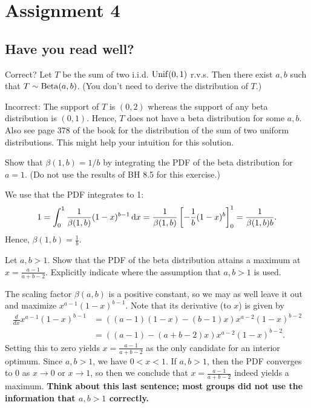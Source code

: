\documentclass[assignments]{subfiles}
\begin{document}
\setcounter{section}{3}
\section{Assignment 4}


\subsection{Have you read well?}


\begin{exercise}
Correct? Let $T$ be the sum of two i.i.d. $\mathrm{Unif}(0,1)$ r.v.s.
Then there exist $a, b$ such that $T \sim \mathrm{Beta}(a,b)$. (You don't need to derive the distribution of $T$.)
\begin{solution}
Incorrect: The support of $T$ is $(0,2)$ whereas the support of any beta distribution is $(0,1)$. Hence, $T$ does not have a beta distribution for some $a,b$.\\
Also see page 378 of the book for the distribution of the sum of two uniform distributions. This might help your intuition for this solution.
\end{solution}
\end{exercise}

\begin{exercise}
Show that $\beta(1, b) = 1/b$ by integrating the PDF of the beta distribution for $a=1$. (Do not use the results of BH 8.5 for this exercise.)
\begin{solution}
We use that the PDF integrates to 1:
$$1 = \int_0^1 \frac1{\beta(1,b)} (1-x)^{b-1} \,\textrm{d}x =  \frac1{\beta(1,b)}  \left[-\frac{1}{b}(1-x)^{b}\right]_0^1 =  \frac{1}{\beta(1,b) b}.$$
Hence, $\beta(1, b) = \frac1b$.
\end{solution}
\end{exercise}

\begin{exercise}
Let $a, b > 1$. Show that the PDF of the beta distribution attains a maximum at $x = \frac{a-1}{a+b-2}$. Explicitly indicate where the assumption that  $a, b > 1$ is used.
\begin{solution}
The scaling factor $\beta(a, b)$ is a positive constant, so we may as well leave it out and maximize $x^{a-1}(1-x)^{b-1}$. Note that its derivative (to $x$) is given by
\begin{align*}
\frac{d}{dx} x^{a-1}(1-x)^{b-1} &= ((a-1)(1-x) -(b-1)x)x^{a-2}(1-x)^{b-2} \\ &= ((a-1) - (a+b-2)x) x^{a-2}(1-x)^{b-2}.
\end{align*}
Setting this to zero yields $x = \frac{a-1}{a+b-2}$ as the only candidate for an interior optimum. Since $a, b > 1$, we have $0 < x < 1$. If  $a, b > 1$, then the PDF converges to 0 as $x \to 0$ or $x \to 1$, so then we conclude that $x = \frac{a-1}{a+b-2}$ indeed yields a maximum. \textbf{Think about this last sentence; most groups did not use the information that $a,b>1$ correctly.}
\end{solution}
\end{exercise}
\end{document}
